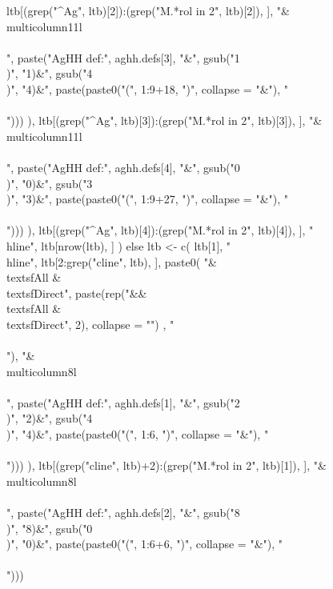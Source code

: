 \begin{Schunk}
\begin{Sinput}
{{      ltb[(grep("^Ag", ltb)[2]):(grep("M.*rol in 2", ltb)[2]), ],
      "&\\multicolumn{11}{l}{}\\\\",
      paste("AgHH def:", aghh.defs[3], "&",
        gsub("1\\)", "1)&", gsub("4\\)", "4)&", paste(paste0("(", 1:9+18, ")", collapse = "&"), "\\\\")))
        ),
      ltb[(grep("^Ag", ltb)[3]):(grep("M.*rol in 2", ltb)[3]), ], 
      "&\\multicolumn{11}{l}{}\\\\",
      paste("AgHH def:", aghh.defs[4], "&",
        gsub("0\\)", "0)&", gsub("3\\)", "3)&", paste(paste0("(", 1:9+27, ")", collapse = "&"), "\\\\")))
        ),
      ltb[(grep("^Ag", ltb)[4]):(grep("M.*rol in 2", ltb)[4]), ],
      "\\hline",
        ltb[nrow(ltb), ]
      ) else
    ltb <- c(
      ltb[1], 
      "\\hline", 
      ltb[2:grep("cline", ltb), ],
      paste0(
        "&\\textsf{All} & \\textsf{Direct}",
        paste(rep("&&\\textsf{All} & \\textsf{Direct}", 2), collapse = "")
        , "\\\\"),
      "&\\multicolumn{8}{l}{}\\\\",
      paste("AgHH def:", aghh.defs[1], "&",
        gsub("2\\)", "2)&", gsub("4\\)", "4)&", paste(paste0("(", 1:6, ")", collapse = "&"), "\\\\")))
        ),
      ltb[(grep("cline", ltb)+2):(grep("M.*rol in 2", ltb)[1]), ], 
      "&\\multicolumn{8}{l}{}\\\\",
      paste("AgHH def:", aghh.defs[2], "&",
        gsub("8\\)", "8)&", gsub("0\\)", "0)&", paste(paste0("(", 1:6+6, ")", collapse = "&"), "\\\\")))
}}
\end{Sinput}
\end{Schunk}
